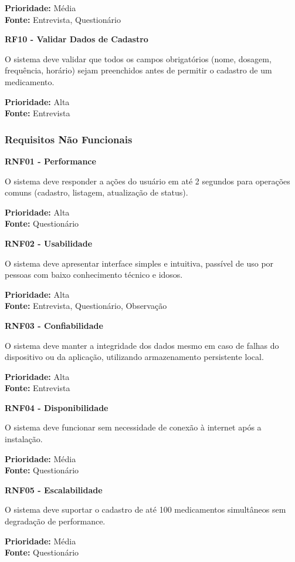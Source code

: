 \documentclass[12pt]{article}
\begin{document}
\textbf{Prioridade:} Média \\
\textbf{Fonte:} Entrevista, Questionário

\textbf{RF10 - Validar Dados de Cadastro}

O sistema deve validar que todos os campos obrigatórios (nome, dosagem, frequência, horário) sejam preenchidos antes de permitir o cadastro de um medicamento.

\textbf{Prioridade:} Alta \\
\textbf{Fonte:} Entrevista

\subsubsection{Requisitos Não Funcionais}

\textbf{RNF01 - Performance}

O sistema deve responder a ações do usuário em até 2 segundos para operações comuns (cadastro, listagem, atualização de status).

\textbf{Prioridade:} Alta \\
\textbf{Fonte:} Questionário

\textbf{RNF02 - Usabilidade}

O sistema deve apresentar interface simples e intuitiva, passível de uso por pessoas com baixo conhecimento técnico e idosos.

\textbf{Prioridade:} Alta \\
\textbf{Fonte:} Entrevista, Questionário, Observação

\textbf{RNF03 - Confiabilidade}

O sistema deve manter a integridade dos dados mesmo em caso de falhas do dispositivo ou da aplicação, utilizando armazenamento persistente local.

\textbf{Prioridade:} Alta \\
\textbf{Fonte:} Entrevista

\textbf{RNF04 - Disponibilidade}

O sistema deve funcionar sem necessidade de conexão à internet após a instalação.

\textbf{Prioridade:} Média \\
\textbf{Fonte:} Questionário

\textbf{RNF05 - Escalabilidade}

O sistema deve suportar o cadastro de até 100 medicamentos simultâneos sem degradação de performance.

\textbf{Prioridade:} Média \\
\textbf{Fonte:} Questionário
\end{document}
